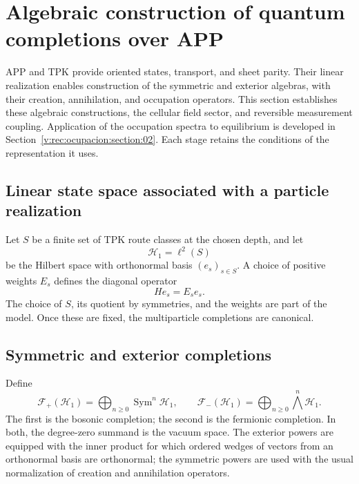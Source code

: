 \section{Algebraic construction of quantum completions over APP}
\label{v:rec:chap:completaciones-cuanticas}
\label{v:sec:completaciones-algebraicas}

APP and TPK provide oriented states, transport, and sheet parity.
Their linear realization enables construction of the symmetric and exterior algebras,
with their creation, annihilation, and occupation operators. This section
establishes these algebraic constructions, the cellular field sector, and
reversible measurement coupling. Application of the occupation spectra to equilibrium is developed in Section~\ref{v:rec:ocupacion:section:02}.
Each stage retains the conditions of the representation it uses.

\subsection{Linear state space associated with a particle realization}
\label{v:rec:completaciones:section:02}

Let \(S\) be a finite set of TPK route classes at the chosen depth,
and let
\[
 \mathcal H_1=\ell^2(S)
\]
be the Hilbert space with orthonormal basis \((e_s)_{s\in S}\). A choice of
positive weights \(E_s\) defines the diagonal operator
\[
 He_s=E_se_s.
\]
The choice of \(S\), its quotient by symmetries, and the weights are part
of the model. Once these are fixed, the multiparticle completions are canonical.

\subsection{Symmetric and exterior completions}
\label{v:rec:completaciones:section:03}

Define
\[
 \mathcal F_+(\mathcal H_1)=
 \bigoplus_{n\geq0}\operatorname{Sym}^n\mathcal H_1,
 \qquad
 \mathcal F_-(\mathcal H_1)=
 \bigoplus_{n\geq0}\bigwedge^n\mathcal H_1.
\]
The first is the bosonic completion; the second is the fermionic completion. In both,
the degree-zero summand is the vacuum space. The exterior powers
are equipped with the inner product for which ordered wedges of vectors
from an orthonormal basis are orthonormal; the symmetric powers are used
with the usual normalization of creation and annihilation operators.

